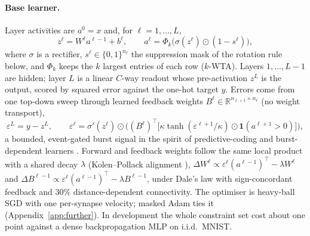 \documentclass{article}
\newcommand{\kwta}{$k$-WTA}
\begin{document}
\paragraph{Base learner.} Layer activities are $a^0=x$ and, for $\ell=1,\dots,L$,
\begin{equation}
z^\ell = W^\ell a^{\ell-1} + b^\ell,\qquad
a^\ell = \Phi_k\!\big(\sigma(z^\ell)\odot(1-s^\ell)\big),
\label{eq:forward}
\end{equation}
where $\sigma$ is a rectifier, $s^\ell\in\{0,1\}^{n_\ell}$ the suppression mask of the
rotation rule below, and $\Phi_k$ keeps the $k$ largest entries of each row (\kwta). Layers
$1,\dots,L{-}1$ are hidden; layer $L$ is a linear $C$-way readout whose pre-activation $z^L$
is the output, scored by squared error against the one-hot target $y$. Errors come from one
top-down sweep through learned feedback weights $B^\ell\in\mathbb{R}^{n_{\ell+1}\times n_\ell}$
(no weight transport),
\begin{equation}
\varepsilon^L = y - z^L,\qquad
\varepsilon^\ell = \sigma'(z^\ell)\odot\Big((B^\ell)^{\!\top}\big[\kappa\tanh(\varepsilon^{\ell+1}/\kappa)\odot\mathbf{1}(a^{\ell+1}>0)\big]\Big),
\label{eq:sweep}
\end{equation}
a bounded, event-gated burst signal in the spirit of predictive-coding and burst-dependent
learners \citep{whittington2017,payeur2021}. Forward and feedback weights follow the same
local product with a shared decay $\lambda$ (Kolen--Pollack alignment
\citep{kolen1994,akrout2019}), $\Delta W^\ell\propto\varepsilon^\ell(a^{\ell-1})^{\!\top}-\lambda W^\ell$
and $\Delta B^{\ell-1}\propto\varepsilon^\ell(a^{\ell-1})^{\!\top}-\lambda B^{\ell-1}$, under
Dale's law with sign-concordant feedback and $30\%$ distance-dependent connectivity. The
optimiser is heavy-ball SGD with one per-synapse velocity; masked Adam ties it
(Appendix~\ref{app:further}). In development the whole constraint set cost about one point
against a dense backpropagation MLP on i.i.d.\ MNIST.
\end{document}
